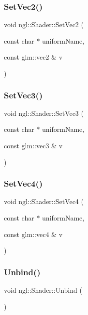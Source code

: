 \subsubsection{\texorpdfstring{Set\+Vec2()}{SetVec2()}}
{\footnotesize\ttfamily void ngl\+::\+Shader\+::\+Set\+Vec2 (\begin{DoxyParamCaption}\item[{const char $\ast$}]{uniform\+Name,  }\item[{const glm\+::vec2 \&}]{v }\end{DoxyParamCaption})}

\mbox{\label{classngl_1_1_shader_adff0ef55d2e5794944f64aa5394ff3d2}} 
\subsubsection{\texorpdfstring{Set\+Vec3()}{SetVec3()}}
{\footnotesize\ttfamily void ngl\+::\+Shader\+::\+Set\+Vec3 (\begin{DoxyParamCaption}\item[{const char $\ast$}]{uniform\+Name,  }\item[{const glm\+::vec3 \&}]{v }\end{DoxyParamCaption})}

\mbox{\label{classngl_1_1_shader_a92eec76ca33087f5e28d8ebc210f82a4}} 
\subsubsection{\texorpdfstring{Set\+Vec4()}{SetVec4()}}
{\footnotesize\ttfamily void ngl\+::\+Shader\+::\+Set\+Vec4 (\begin{DoxyParamCaption}\item[{const char $\ast$}]{uniform\+Name,  }\item[{const glm\+::vec4 \&}]{v }\end{DoxyParamCaption})}

\mbox{\label{classngl_1_1_shader_a70f8359738b84645ad00187f67b76ed7}} 
\subsubsection{\texorpdfstring{Unbind()}{Unbind()}}
{\footnotesize\ttfamily void ngl\+::\+Shader\+::\+Unbind (\begin{DoxyParamCaption}{ }\end{DoxyParamCaption})}



